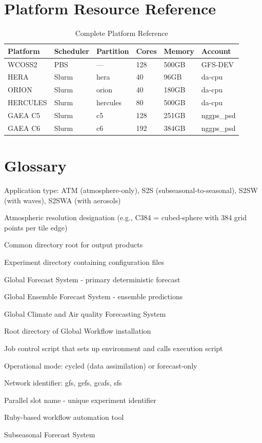 \documentclass[11pt,letterpaper]{article}
\begin{document}
\section{Platform Resource Reference}
\label{app:platform-reference}

\begin{table}[H]
\centering
\caption{Complete Platform Reference}
\begin{tabular}{@{}llllll@{}}
\toprule
\textbf{Platform} & \textbf{Scheduler} & \textbf{Partition} & \textbf{Cores} & \textbf{Memory} & \textbf{Account} \\
\midrule
WCOSS2 & PBS & --- & 128 & 500GB & GFS-DEV \\
HERA & Slurm & hera & 40 & 96GB & da-cpu \\
ORION & Slurm & orion & 40 & 180GB & da-cpu \\
HERCULES & Slurm & hercules & 80 & 500GB & da-cpu \\
GAEA C5 & Slurm & c5 & 128 & 251GB & nggps\_psd \\
GAEA C6 & Slurm & c6 & 192 & 384GB & nggps\_psd \\
\bottomrule
\end{tabular}
\end{table}

\section{Glossary}
\label{app:glossary}

\begin{description}[style=nextline]
    \item[APP] Application type: ATM (atmosphere-only), S2S (subseasonal-to-seasonal), S2SW (with waves), S2SWA (with aerosols)
    \item[CASE] Atmospheric resolution designation (e.g., C384 = cubed-sphere with 384 grid points per tile edge)
    \item[COMROOT] Common directory root for output products
    \item[EXPDIR] Experiment directory containing configuration files
    \item[GFS] Global Forecast System - primary deterministic forecast
    \item[GEFS] Global Ensemble Forecast System - ensemble predictions
    \item[GCAFS] Global Climate and Air quality Forecasting System
    \item[HOMEgfs] Root directory of Global Workflow installation
    \item[J-Job] Job control script that sets up environment and calls execution script
    \item[MODE] Operational mode: cycled (data assimilation) or forecast-only
    \item[NET] Network identifier: gfs, gefs, gcafs, sfs
    \item[PSLOT] Parallel slot name - unique experiment identifier
    \item[Rocoto] Ruby-based workflow automation tool
    \item[SFS] Subseasonal Forecast System
\end{description}
\end{document}
